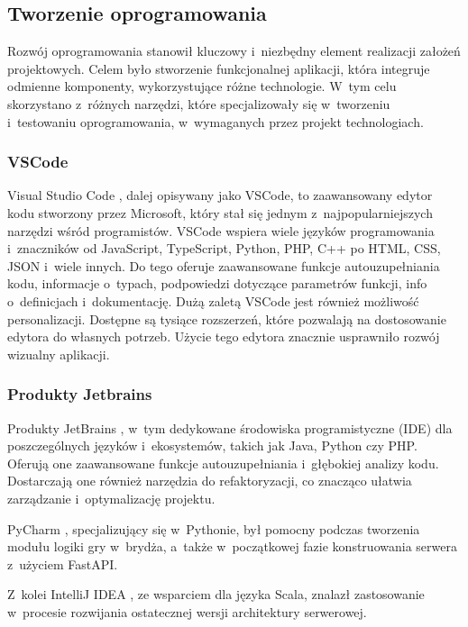 \subsection{Tworzenie oprogramowania}

Rozwój oprogramowania stanowił kluczowy i~niezbędny element realizacji
założeń projektowych.
Celem było stworzenie funkcjonalnej aplikacji, która integruje
odmienne komponenty, wykorzystujące różne technologie.
W~tym celu skorzystano z~różnych narzędzi, które specjalizowały się
w~tworzeniu i~testowaniu oprogramowania, w~wymaganych przez projekt
technologiach.

\subsubsection{VSCode}

Visual Studio Code \cite{VSCode}, dalej opisywany jako VSCode,
to zaawansowany edytor kodu stworzony
przez Microsoft, który stał się jednym z~najpopularniejszych narzędzi
wśród programistów.
VSCode wspiera wiele języków programowania i~znaczników od JavaScript,
TypeScript, Python, PHP, C++ po HTML, CSS, JSON i~wiele innych.
Do tego oferuje zaawansowane funkcje autouzupełniania kodu, informacje
o~typach, podpowiedzi dotyczące parametrów funkcji, info o~definicjach
i~dokumentację.
Dużą zaletą VSCode jest również możliwość personalizacji. Dostępne są
tysiące rozszerzeń, które pozwalają na dostosowanie edytora do własnych
potrzeb. Użycie tego edytora znacznie usprawniło rozwój wizualny aplikacji.

\subsubsection{Produkty Jetbrains}

Produkty JetBrains \cite{JetBrains}, w~tym dedykowane środowiska
programistyczne (IDE) dla poszczególnych języków i~ekosystemów,
takich jak Java, Python czy PHP.
Oferują one zaawansowane funkcje autouzupełniania i~głębokiej
analizy kodu. Dostarczają one również narzędzia do refaktoryzacji,
co znacząco ułatwia zarządzanie i~optymalizację projektu.

PyCharm \cite{PyCharm}, specjalizujący się w~Pythonie, był pomocny podczas tworzenia
modułu logiki gry w~brydża, a~także w~początkowej fazie konstruowania
serwera z~użyciem FastAPI.

Z~kolei IntelliJ IDEA \cite{Intellij}, ze wsparciem dla języka
Scala, znalazł zastosowanie w~procesie rozwijania ostatecznej wersji
architektury serwerowej.

